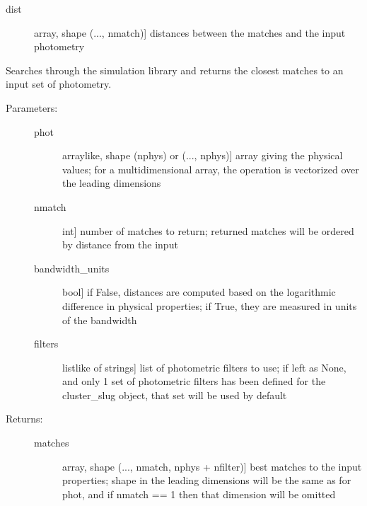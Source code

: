 \documentclass[letterpaper,10pt,english]{sphinxmanual}
\begin{document}
\begin{fulllineitems}
\begin{fulllineitems}
\begin{description}
\begin{description}
\item[{dist}] \leavevmode{[}array, shape (..., nmatch){]}
distances between the matches and the input photometry

\end{description}

\end{description}

\end{fulllineitems}


\begin{fulllineitems}
\label{cluster_slug:slugpy.cluster_slug.cluster_slug.bestmatch_phys}
Searches through the simulation library and returns the closest
matches to an input set of photometry.
\begin{description}
\item[{Parameters:}] \leavevmode\begin{description}
\item[{phot}] \leavevmode{[}arraylike, shape (nphys) or (..., nphys){]}
array giving the physical values; for a
multidimensional array, the operation is vectorized over
the leading dimensions

\item[{nmatch}] \leavevmode{[}int{]}
number of matches to return; returned matches will be
ordered by distance from the input

\item[{bandwidth\_units}] \leavevmode{[}bool{]}
if False, distances are computed based on the
logarithmic difference in physical properties; if True,
they are measured in units of the bandwidth

\item[{filters}] \leavevmode{[}listlike of strings{]}
list of photometric filters to use; if left as None, and
only 1 set of photometric filters has been defined for
the cluster\_slug object, that set will be used by
default

\end{description}

\item[{Returns:}] \leavevmode\begin{description}
\item[{matches}] \leavevmode{[}array, shape (..., nmatch, nphys + nfilter){]}
best matches to the input properties; shape in the
leading dimensions will be the same as for phot, and if
nmatch == 1 then that dimension will be omitted


\end{description}
\end{description}
\end{fulllineitems}
\end{fulllineitems}
\end{document}
